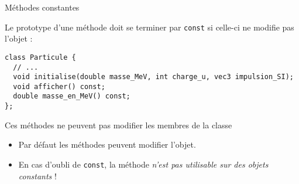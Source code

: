 \documentclass[c]{beamer}
\newcommand{\inline}[1]{\texttt{#1}}
\begin{document}
\begin{frame}[fragile]{Méthodes constantes}

\def\theFancyVerbLine{%
  \color{white}\sffamily\tiny\arabic{FancyVerbLine}%
        {\tikz[remember picture,overlay]\node(minted-\arabic{FancyVerbLine}){};}%
}

Le prototype d'une méthode doit se terminer par \inline{const} si celle-ci ne modifie pas l'objet :
\vspace{1em}

\begin{verbatim}
class Particule {
  // ...
  void initialise(double masse_MeV, int charge_u, vec3 impulsion_SI);
  void afficher() const;
  double masse_en_MeV() const;
};
\end{verbatim}

\pause
{}

\begin{cbox}[7][lbtuc][\centering\small][8][8]
 Ces méthodes ne peuvent pas modifier les membres de la classe
\vspace{0.1em}
\end{cbox}

\begin{itemize}
\item Par défaut les méthodes peuvent modifier l'objet.
\item En cas d'oubli de \inline{const}, la méthode \emph{n'est pas utilisable sur des objets constants} !
\end{itemize}
\end{frame}
\end{document}
